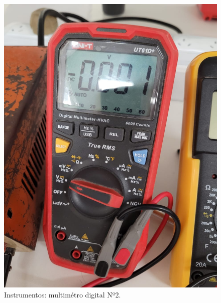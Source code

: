 \documentclass[chaptersright]{informeutn}
\begin{document}
    \begin{figure}[H]
        \centering
        \begin{minipage}{0.3\textwidth}
            \centering
            \includegraphics[width=\textwidth]{pictures/multimetro-gaston.jpeg}
            \caption{Instrumentos: multimétro digital Nº2.}
        \end{minipage}
        \hspace{0.05\textwidth} %
        \begin{minipage}{0.3\textwidth}
            \centering

\end{minipage}
\end{figure}
\end{document}
